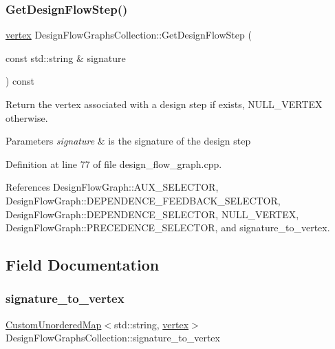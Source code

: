 \subsubsection{\texorpdfstring{Get\+Design\+Flow\+Step()}{GetDesignFlowStep()}}
{\footnotesize\ttfamily \hyperlink{graph_8hpp_abefdcf0544e601805af44eca032cca14}{vertex} Design\+Flow\+Graphs\+Collection\+::\+Get\+Design\+Flow\+Step (\begin{DoxyParamCaption}\item[{const std\+::string \&}]{signature }\end{DoxyParamCaption}) const}



Return the vertex associated with a design step if exists, N\+U\+L\+L\+\_\+\+V\+E\+R\+T\+EX otherwise. 


\begin{DoxyParams}{Parameters}
{\em signature} & is the signature of the design step \\
\hline
\end{DoxyParams}


Definition at line 77 of file design\+\_\+flow\+\_\+graph.\+cpp.



References Design\+Flow\+Graph\+::\+A\+U\+X\+\_\+\+S\+E\+L\+E\+C\+T\+OR, Design\+Flow\+Graph\+::\+D\+E\+P\+E\+N\+D\+E\+N\+C\+E\+\_\+\+F\+E\+E\+D\+B\+A\+C\+K\+\_\+\+S\+E\+L\+E\+C\+T\+OR, Design\+Flow\+Graph\+::\+D\+E\+P\+E\+N\+D\+E\+N\+C\+E\+\_\+\+S\+E\+L\+E\+C\+T\+OR, N\+U\+L\+L\+\_\+\+V\+E\+R\+T\+EX, Design\+Flow\+Graph\+::\+P\+R\+E\+C\+E\+D\+E\+N\+C\+E\+\_\+\+S\+E\+L\+E\+C\+T\+OR, and signature\+\_\+to\+\_\+vertex.



\subsection{Field Documentation}
\mbox{\label{classDesignFlowGraphsCollection_a7acfd27a06c94efb6471230f1c9a8f67}} 
\subsubsection{\texorpdfstring{signature\+\_\+to\+\_\+vertex}{signature\_to\_vertex}}
{\footnotesize\ttfamily \hyperlink{custom__map_8hpp_ad1ed68f2ff093683ab1a33522b144adc}{Custom\+Unordered\+Map}$<$std\+::string, \hyperlink{graph_8hpp_abefdcf0544e601805af44eca032cca14}{vertex}$>$ Design\+Flow\+Graphs\+Collection\+::signature\+\_\+to\+\_\+vertex\hspace{0.3cm}{\ttfamily [protected]}}



